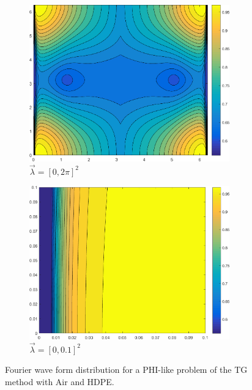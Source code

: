 \begin{figure}
\centering
{
	\begin{subfigure}[b]{0.73\textwidth}
		\centering
		\includegraphics[width=0.95\textwidth]{figures/sec_DSA/MOD_PHI-EC_FULL.png}
		\caption{$\vec{\lambda} = [0,2 \pi]^2$}
	\end{subfigure}
}
	\vspace{1cm}
{
	\begin{subfigure}[b]{0.75\textwidth}
		\centering
		\includegraphics[width=0.95\textwidth]{figures/sec_DSA/MOD_PHI-EC_Zoom=01.png}
		\caption{$\vec{\lambda} = [0,0.1]^2$}
	\end{subfigure}
}
\caption{Fourier wave form distribution for a PHI-like problem of the TG method with Air and HDPE.}
\label{fig::IM1_TG_PHI}
\end{figure}



